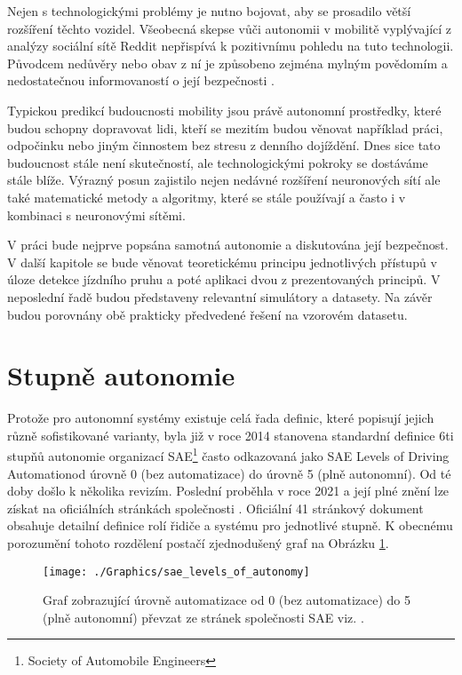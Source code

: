 \documentclass[czech, bc, kky, he, iso690numb]{fasthesis}
\begin{document}
		Nejen s technologickými problémy je nutno bojovat, aby se prosadilo větší rozšíření těchto vozidel. Všeobecná skepse vůči autonomii v mobilitě vyplývající z analýzy sociální sítě Reddit \cite{public_opinion_on_AV} nepřispívá k pozitivnímu pohledu na tuto technologii. Původcem nedůvěry nebo obav z ní je způsobeno zejména mylným povědomím a nedostatečnou informovaností o její bezpečnosti \cite{AV_vs_CV_crashes}.
		
		Typickou predikcí budoucnosti mobility jsou právě autonomní prostředky, které budou schopny dopravovat lidi, kteří se mezitím budou věnovat například práci, odpočinku nebo jiným činnostem bez stresu z denního dojíždění. Dnes sice tato budoucnost stále není skutečností, ale technologickými pokroky se dostáváme stále blíže. Výrazný posun zajistilo nejen nedávné rozšíření neuronových sítí ale také matematické metody a algoritmy, které se stále používají a často i v kombinaci s neuronovými sítěmi.
		
		V práci bude nejprve popsána samotná autonomie a diskutována její bezpečnost. V další kapitole se bude věnovat teoretickému principu jednotlivých přístupů v úloze detekce jízdního pruhu a poté aplikaci dvou z prezentovaných principů. V neposlední řadě budou představeny relevantní simulátory a datasety. Na závěr budou porovnány obě prakticky předvedené řešení na vzorovém datasetu.
    
    \section{Stupně autonomie}
       	Protože pro autonomní systémy existuje celá řada definic, které popisují jejich různě sofistikované varianty, byla již v roce 2014 stanovena standardní definice 6ti stupňů autonomie organizací SAE\footnote{Society of Automobile Engineers} často odkazovaná jako SAE Levels of Driving Automation\texttrademark od úrovně 0 (bez automatizace) do  úrovně 5 (plně autonomní). Od té doby došlo k několika revizím. Poslední proběhla v roce 2021 a její plné znění lze získat na oficiálních stránkách společnosti \cite{SAE_autonomy_levels}. Oficiální 41 stránkový dokument obsahuje detailní definice rolí řidiče a systému pro jednotlivé stupně. K obecnému porozumění tohoto rozdělení postačí zjednodušený graf na Obrázku \ref{pic:levels_of_autonomy}.
       	
       		\begin{figure}[h]
       			\centering
       			\texttt{[image: ./Graphics/sae\_levels\_of\_autonomy]}
       			\caption{Graf zobrazující úrovně automatizace od 0 (bez automatizace) do 5 (plně autonomní) převzat ze stránek společnosti SAE viz. \cite{SAE_autonomy_levels_web}.}
       			\label{pic:levels_of_autonomy}
       		\end{figure}
       	
\end{document}
